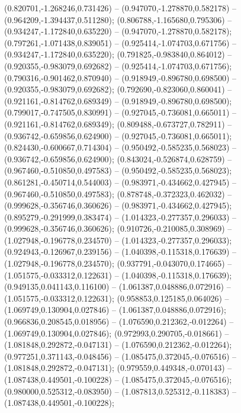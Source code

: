  (0.820701,-1.268246,0.731426) -- (0.947070,-1.278870,0.582178) -- (0.964209,-1.394437,0.511280);
 (0.806788,-1.165680,0.795306) -- (0.934247,-1.172840,0.635220) -- (0.947070,-1.278870,0.582178);
 (0.797261,-1.071438,0.839051) -- (0.925414,-1.074703,0.671756) -- (0.934247,-1.172840,0.635220);
 (0.791825,-0.983840,0.864012) -- (0.920355,-0.983079,0.692682) -- (0.925414,-1.074703,0.671756);
 (0.790316,-0.901462,0.870940) -- (0.918949,-0.896780,0.698500) -- (0.920355,-0.983079,0.692682);
 (0.792690,-0.823060,0.860041) -- (0.921161,-0.814762,0.689349) -- (0.918949,-0.896780,0.698500);
 (0.799017,-0.747505,0.830991) -- (0.927045,-0.736081,0.665011) -- (0.921161,-0.814762,0.689349);
 (0.809488,-0.673727,0.782911) -- (0.936742,-0.659856,0.624900) -- (0.927045,-0.736081,0.665011);
 (0.824430,-0.600667,0.714304) -- (0.950492,-0.585235,0.568023) -- (0.936742,-0.659856,0.624900);
 (0.843024,-0.526874,0.628759) -- (0.967460,-0.510850,0.497583) -- (0.950492,-0.585235,0.568023);
 (0.861281,-0.450714,0.544003) -- (0.983971,-0.434662,0.427945) -- (0.967460,-0.510850,0.497583);
 (0.878748,-0.372323,0.462032) -- (0.999628,-0.356746,0.360626) -- (0.983971,-0.434662,0.427945);
 (0.895279,-0.291999,0.383474) -- (1.014323,-0.277357,0.296033) -- (0.999628,-0.356746,0.360626);
 (0.910726,-0.210085,0.308969) -- (1.027948,-0.196778,0.234570) -- (1.014323,-0.277357,0.296033);
 (0.924943,-0.126967,0.239156) -- (1.040398,-0.115318,0.176639) -- (1.027948,-0.196778,0.234570);
 (0.937791,-0.043070,0.174665) -- (1.051575,-0.033312,0.122631) -- (1.040398,-0.115318,0.176639);
 (0.949135,0.041143,0.116100) -- (1.061387,0.048886,0.072916) -- (1.051575,-0.033312,0.122631);
 (0.958853,0.125185,0.064026) -- (1.069749,0.130904,0.027846) -- (1.061387,0.048886,0.072916);
 (0.966836,0.208545,0.018956) -- (1.076590,0.212362,-0.012264) -- (1.069749,0.130904,0.027846);
 (0.972993,0.290705,-0.018661) -- (1.081848,0.292872,-0.047131) -- (1.076590,0.212362,-0.012264);
 (0.977251,0.371143,-0.048456) -- (1.085475,0.372045,-0.076516) -- (1.081848,0.292872,-0.047131);
 (0.979559,0.449348,-0.070143) -- (1.087438,0.449501,-0.100228) -- (1.085475,0.372045,-0.076516);
 (0.980000,0.525312,-0.083950) -- (1.087813,0.525312,-0.118383) -- (1.087438,0.449501,-0.100228);
